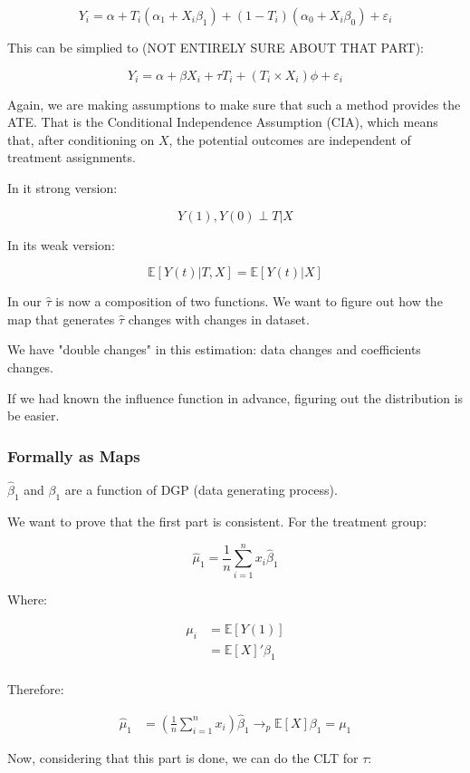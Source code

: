 \documentclass{article}
\begin{document}
$$
Y_i = \alpha + T_i (\alpha_1 + X_i \beta_1) + (1 - T_i)(\alpha_0 + X_i \beta_0) + \varepsilon_i
$$

This can be simplied to (NOT ENTIRELY SURE ABOUT THAT PART):

$$
Y_i = \alpha + \beta X_i + \tau T_i + (T_i \times X_i) \phi + \varepsilon_i
$$

Again, we are making assumptions to make sure that such a method provides the ATE. That is the Conditional Independence Assumption (CIA), which means that, after conditioning on $X$, the potential outcomes are independent of treatment assignments.

In it strong version:

$$
Y(1), Y(0) \perp T | X
$$

In its weak version:

$$
\mathbb{E}[Y(t) | T, X] = \mathbb{E}[Y(t)| X]
$$

In our $\hat{\tau}$ is now a composition of two functions. We want to figure out how the map that generates $\hat{\tau}$ changes with changes in dataset.

We have "double changes" in this estimation: data changes and coefficients changes.

If we had known the influence function in advance, figuring out the distribution is be easier.

\subsubsection{Formally as Maps}
$\hat{\beta}_1$ and $\beta_1$ are a function of DGP (data generating process).

We want to prove that the first part is consistent. For the treatment group:

$$
\hat{\mu}_1 = \frac{1}{n} \sum_{i=1}^{n} x_i \hat{\beta}_1
$$

Where:

\begin{align*}
    \mu_i
    &= \mathbb{E}[Y(1)] \\
    &= \mathbb{E}[X]' \beta_1 \\
\end{align*}

Therefore:

\begin{align*}
\hat{\mu}_1
&= \left(\frac{1}{n} \sum_{i=1}^{n} x_i\right) \hat{\beta}_1 \to_p \mathbb{E}[X] \beta_1 = \mu_1
\end{align*}

Now, considering that this part is done, we can do the CLT for $\tau$:
\end{document}
